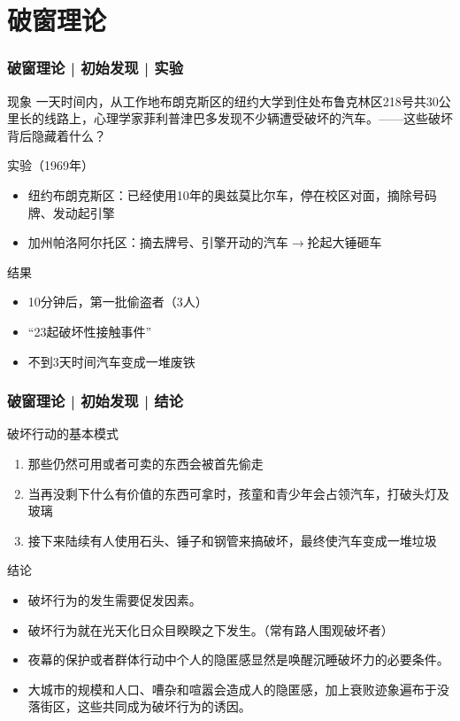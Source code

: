 \section{破窗理论}
\begin{frame}
  \frametitle{破窗理论 | 初始发现 | 实验}
  \vspace{-0.5em}
  \begin{block}{现象}
一天时间内，从工作地布朗克斯区的纽约大学到住处布鲁克林区218号共30公里长的线路上，心理学家菲利普\textbullet 津巴多发现不少辆遭受破坏的汽车。——这些破坏背后隐藏着什么？
  \end{block}
  \pause
  \begin{block}{实验（1969年）}
    \begin{itemize}
      \item 纽约布朗克斯区：已经使用10年的奥兹莫比尔车，停在校区对面，摘除号码牌、发动起引擎
      \item 加州帕洛阿尔托区：摘去牌号、引擎开动的汽车$\longrightarrow$抡起大锤砸车
    \end{itemize}
  \end{block}
  \begin{block}{结果}
    \begin{itemize}
      \item 10分钟后，第一批偷盗者（3人）
      \item “23起破坏性接触事件”
      \item 不到3天时间汽车变成一堆废铁
    \end{itemize}
  \end{block}
\end{frame}

\begin{frame}
  \frametitle{破窗理论 | 初始发现 | 结论}
  \begin{block}{破坏行动的基本模式}
    \begin{enumerate}
      \item 那些仍然可用或者可卖的东西会被首先偷走
      \item 当再没剩下什么有价值的东西可拿时，孩童和青少年会占领汽车，打破头灯及玻璃
      \item 接下来陆续有人使用石头、锤子和钢管来搞破坏，最终使汽车变成一堆垃圾
    \end{enumerate}
  \end{block}
  \pause
  \begin{block}{结论}
    \begin{itemize}
      \item 破坏行为的发生需要促发因素。
      \item 破坏行为就在光天化日众目睽睽之下发生。（常有路人围观破坏者）
      \item 夜幕的保护或者群体行动中个人的隐匿感显然是唤醒沉睡破坏力的必要条件。
      \item 大城市的规模和人口、嘈杂和喧嚣会造成人的隐匿感，加上衰败迹象遍布于没落街区，这些共同成为破坏行为的诱因。
    \end{itemize}
  \end{block}
\end{frame}

